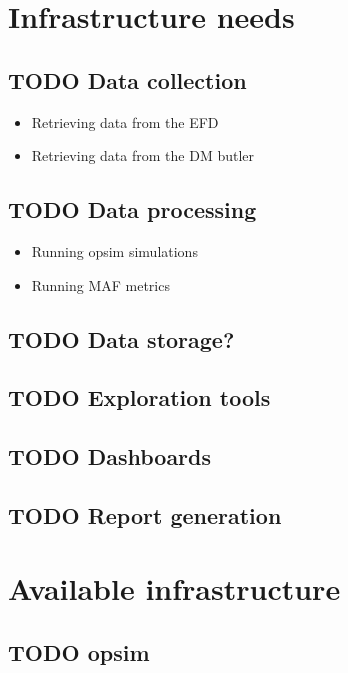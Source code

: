 \section{Infrastructure needs}
\label{sec:org4b2538b}
\subsection{{\bfseries\sffamily TODO} Data collection}
\label{sec:org25835ba}
\begin{itemize}
\item Retrieving data from the EFD
\label{sec:org69332be}
\item Retrieving data from the DM butler
\label{sec:orgee794f9}
\end{itemize}
\subsection{{\bfseries\sffamily TODO} Data processing}
\label{sec:orgb26610d}
\begin{itemize}
\item Running opsim simulations
\label{sec:org1d272c8}
\item Running MAF metrics
\label{sec:orgb1b6d5a}
\end{itemize}
\subsection{{\bfseries\sffamily TODO} Data storage?}
\label{sec:orgbb6a35a}
\subsection{{\bfseries\sffamily TODO} Exploration tools}
\label{sec:org5c55241}
\subsection{{\bfseries\sffamily TODO} Dashboards}
\label{sec:org5e0d9fa}
\subsection{{\bfseries\sffamily TODO} Report generation}
\label{sec:org922b570}
\section{Available infrastructure}
\label{sec:org113a4d7}
\subsection{{\bfseries\sffamily TODO} opsim}
\label{sec:org0dabfef}
